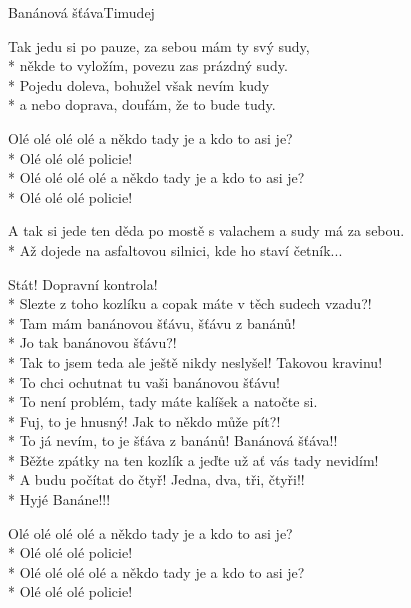 \documentclass[10.5pt]{book}
\begin{document}
\begin{poem}{Banánová šťáva}{Timudej}

\settowidth{\versewidth}{A tak si jede ten děda po mostě s valachem a sudy má za sebou.}

Tak jedu si po pauze, za sebou mám ty svý sudy,\\*
někde to vyložím, povezu zas prázdný sudy.\\*
Pojedu doleva, bohužel však nevím kudy\\*
a nebo doprava, doufám, že to bude tudy.

Olé olé olé olé a někdo tady je a kdo to asi je?\\*
Olé olé olé policie!\\*
Olé olé olé olé a někdo tady je a kdo to asi je?\\*
Olé olé olé policie!

A tak si jede ten děda po mostě s valachem a sudy má za sebou.\\*
Až dojede na asfaltovou silnici, kde ho staví četník...

Stát! Dopravní kontrola!\\*
Slezte z toho kozlíku a copak máte v těch sudech vzadu?!\\*
Tam mám banánovou šťávu, šťávu z banánů!\\*
Jo tak banánovou šťávu?!\\*
Tak to jsem teda ale ještě nikdy neslyšel! Takovou kravinu!\\*
To chci ochutnat tu vaši banánovou šťávu!\\*
To není problém, tady máte kalíšek a natočte si.\\*
Fuj, to je hnusný! Jak to někdo může pít?!\\*
To já nevím, to je šťáva z banánů! Banánová šťáva!!\\*
Běžte zpátky na ten kozlík a jeďte už ať vás tady nevidím!\\*
A budu počítat do čtyř! Jedna, dva, tři, čtyři!!\\*
Hyjé Banáne!!!

Olé olé olé olé a někdo tady je a kdo to asi je?\\*
Olé olé olé policie!\\*
Olé olé olé olé a někdo tady je a kdo to asi je?\\*
Olé olé olé policie!

\end{poem}
\end{document}
